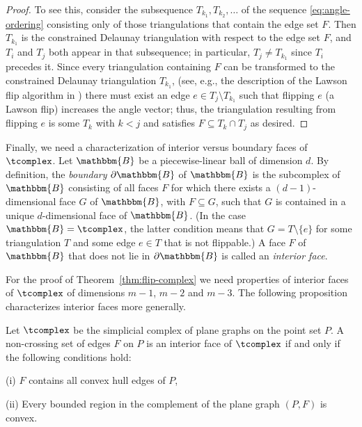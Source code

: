 \begin{proof}
To see this, consider the subsequence 
$T_{k_1},T_{k_2},\dots $ of the sequence \eqref{eq:angle-ordering} consisting only of those triangulations that contain the edge set $F$. Then $T_{k_1}$ is the constrained Delaunay 
triangulation with respect to the edge set $F$, and $T_i$ and $T_j$ both appear in that
subsequence; in particular, $T_j\neq T_{k_1}$ since $T_i$ precedes it. Since every triangulation
containing $F$ can be transformed to the constrained Delaunay triangulation $T_{k_1}$,
(see, e.g., the description of the Lawson flip algorithm in \cite{devadoss2011discrete})
there must exist an edge $e\in T_{j}\setminus T_{k_1}$ such that flipping $e$ (a Lawson flip)
increases the angle vector; thus, the triangulation resulting from flipping $e$ is some
$T_k$ with $k<j$ and satisfies $F\subseteq T_k\cap T_j$ as desired.
\end{proof}

Finally, we need a characterization of interior versus boundary faces of  $\tcomplex$.
Let $\mathbbm{B}$ be a piecewise-linear ball of dimension $d$. By definition, the \emph{boundary} $\partial\mathbbm{B}$ of $\mathbbm{B}$ is the subcomplex of $\mathbbm{B}$ consisting of all faces $F$ for which there exists a $(d-1)$-dimensional face $G$ of 
$\mathbbm{B}$, with $F\subseteq G$, such that $G$ is contained in a unique $d$-dimensional face of $\mathbbm{B}$. (In the case $\mathbbm{B}=\tcomplex$, the latter condition means that $G=T\setminus \{e\}$ for some triangulation $T$ and some edge $e\in T$ that is not flippable.)
A face $F$ of $\mathbbm{B}$ that does not lie in $\partial \mathbbm{B}$ is called an \emph{interior face}.

For the proof of Theorem~\ref{thm:flip-complex} we need properties of interior faces of $\tcomplex$ of dimensions $m-1$, $m-2$ and $m-3$.  The following proposition characterizes interior faces more generally.


\begin{proposition} 
\label{prop:interior-faces}
Let $\tcomplex$ be the simplicial complex of plane graphs on the
point set $P$. A non-crossing set of edges $F$ on $P$ is an interior face of
$\tcomplex$ if and only if the following conditions hold:

(i) $F$ contains all convex hull edges of $P$,

(ii) Every bounded region in the complement of the plane graph $\left(P,F\right)$ is convex.
\end{proposition}

